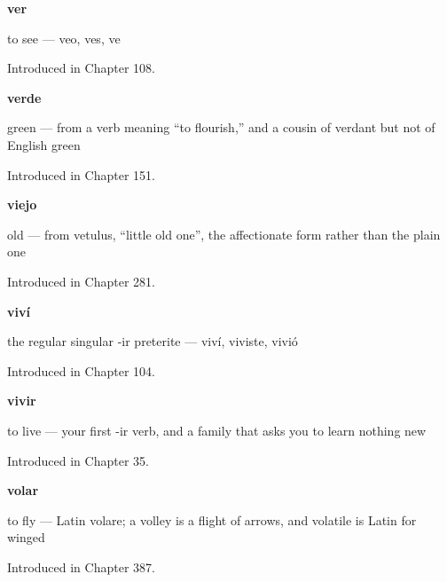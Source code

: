 \noindent\begin{minipage}[t]{\linewidth}
\raggedright
\textbf{ver}\par
\small to see — veo, ves, ve\par
\footnotesize Introduced in Chapter 108.
\end{minipage}\par\medskip

\noindent\begin{minipage}[t]{\linewidth}
\raggedright
\textbf{verde}\par
\small green — from a verb meaning \textquotedblleft{}to flourish,\textquotedblright{} and a cousin of verdant but not of English green\par
\footnotesize Introduced in Chapter 151.
\end{minipage}\par\medskip

\noindent\begin{minipage}[t]{\linewidth}
\raggedright
\textbf{viejo}\par
\small old — from vetulus, \textquotedblleft{}little old one\textquotedblright{}, the affectionate form rather than the plain one\par
\footnotesize Introduced in Chapter 281.
\end{minipage}\par\medskip

\noindent\begin{minipage}[t]{\linewidth}
\raggedright
\textbf{viví}\par
\small the regular singular -ir preterite — viví, viviste, vivió\par
\footnotesize Introduced in Chapter 104.
\end{minipage}\par\medskip

\noindent\begin{minipage}[t]{\linewidth}
\raggedright
\textbf{vivir}\par
\small to live — your first -ir verb, and a family that asks you to learn nothing new\par
\footnotesize Introduced in Chapter 35.
\end{minipage}\par\medskip

\noindent\begin{minipage}[t]{\linewidth}
\raggedright
\textbf{volar}\par
\small to fly — Latin volare; a volley is a flight of arrows, and volatile is Latin for winged\par
\footnotesize Introduced in Chapter 387.
\end{minipage}\par\medskip

